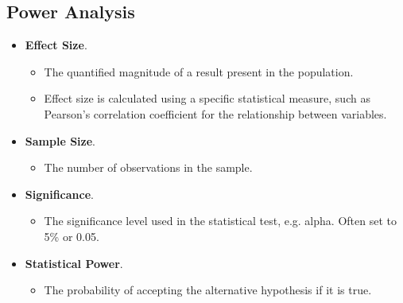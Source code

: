 \documentclass[10pt,article]{article}
\begin{document}
\subsection{Power Analysis}
\label{sec:orge33f8f3}
\begin{itemize}
\item \textbf{Effect Size}.
\begin{itemize}
\item The quantified magnitude of a result present in the population.
\item Effect size is calculated using a specific statistical measure, such as Pearson’s correlation coefficient for the relationship between variables.
\end{itemize}
\item \textbf{Sample Size}.
\begin{itemize}
\item The number of observations in the sample.
\end{itemize}
\item \textbf{Significance}.
\begin{itemize}
\item The significance level used in the statistical test, e.g. alpha. Often set to 5\% or 0.05.
\end{itemize}
\item \textbf{Statistical Power}.
\begin{itemize}
\item The probability of accepting the alternative hypothesis if it is true.
\end{itemize}
\end{itemize}
\end{document}
